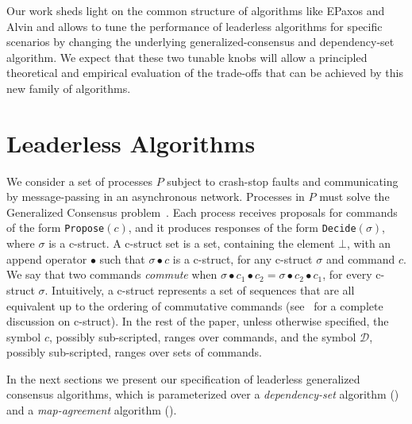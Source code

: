 Our work sheds light on the common structure of algorithms like EPaxos and Alvin and allows to tune the performance of leaderless algorithms for specific scenarios by changing the underlying generalized-consensus and dependency-set algorithm. 
We expect that these two tunable knobs will allow a principled theoretical and empirical evaluation of the trade-offs that can be achieved by this new family of algorithms.

\section{Leaderless Algorithms}



We consider a set of processes $P$ subject to crash-stop faults and communicating by message-passing in an asynchronous network. Processes in $P$ must solve the Generalized Consensus problem~\cite{lamport-generalized}. Each process receives proposals for commands of the form \texttt{Propose}$(c)$, and it produces responses of the form \texttt{Decide}$(\sigma)$, where $\sigma$ is a c-struct. A c-struct set is a set, containing the element $\bot$, with an append operator $\bullet$ such that $\sigma \bullet c$ is a c-struct, for any c-struct $\sigma$ and command $c$. We say that two commands \textit{commute} when $\sigma\bullet c_1\bullet c_2 =  \sigma\bullet c_2\bullet c_1 $, for every c-struct $\sigma$. Intuitively, a c-struct represents a set of sequences that are all equivalent up to the ordering of commutative commands (see~\cite{lamport-generalized} for a complete discussion on c-struct). In the rest of the paper, unless otherwise specified, the symbol $c$, possibly sub-scripted, ranges over commands, and the symbol $\mathcal{D}$, possibly sub-scripted, ranges over sets of commands.

In the next sections we present our specification of leaderless generalized consensus algorithms, which is parameterized over a \textit{dependency-set} algorithm () and a \textit{map-agreement} algorithm (). 

